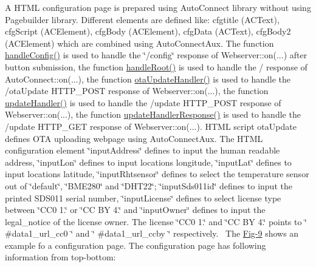 A H\+T\+ML configuration page is prepared using Auto\+Connect library without using Pagebuilder library. Different elements are defined like\+: cfgtitle (A\+C\+Text), cfg\+Script (A\+C\+Element), cfg\+Body (A\+C\+Element), cfg\+Data (A\+C\+Text), cfg\+Body2 (A\+C\+Element) which are combined using Auto\+Connect\+Aux. The function \mbox{\hyperlink{main_8h_a26b99cccf6c7e87054577b293e709733}{handle\+Config()}} is used to handle the \char`\"{}/config\char`\"{} response of Webserver\+::on(...) after button submission, the function \mbox{\hyperlink{main_8h_ad9a1e86fe8a8ccdeddbd435307dc8b9c}{handle\+Root()}} is used to handle the / response of Auto\+Connect\+::on(...), the function \mbox{\hyperlink{main_8h_adb1e5699d1d537b00a661d58f303b8c0}{ota\+Update\+Handler()}} is used to handle the /ota\+Update H\+T\+T\+P\+\_\+\+P\+O\+ST response of Webserver\+::on(...), the function \mbox{\hyperlink{main_8h_ac18409cbc727fcbb81831d42abceffc2}{update\+Handler()}} is used to handle the /update H\+T\+T\+P\+\_\+\+P\+O\+ST response of Webserver\+::on(...), the function \mbox{\hyperlink{main_8h_a27d0e99a6ba203be7c65cd32285853c2}{update\+Handler\+Response()}} is used to handle the /update H\+T\+T\+P\+\_\+\+G\+ET response of Webserver\+::on(...). H\+T\+ML script ota\+Update defines O\+TA uploading webpage using Auto\+Connect\+Aux. The H\+T\+ML configuration element \char`\"{}input\+Address\char`\"{} defines to input the human readable address, \char`\"{}input\+Lon\char`\"{} defines to input location\textquotesingle{}s longitude, \char`\"{}input\+Lat\char`\"{} defines to input location\textquotesingle{}s latitude, \char`\"{}input\+Rhtsensor\char`\"{} defines to select the temperature sensor out of \char`\"{}default\char`\"{}, \char`\"{}\+B\+M\+E280\char`\"{} and \char`\"{}\+D\+H\+T22\char`\"{}; \char`\"{}input\+Sds011id\char`\"{} defines to input the printed S\+D\+S011 serial number, \char`\"{}input\+License\char`\"{} defines to select license type between \char`\"{}\+C\+C0 1.\char`\"{} or \char`\"{}\+C\+C B\+Y 4.\char`\"{} and \char`\"{}input\+Owner\char`\"{} defines to input the legal\+\_\+notice of the license owner. The license \char`\"{}\+C\+C0 1.\char`\"{} and \char`\"{}\+C\+C B\+Y 4.\char`\"{} points to \char`\"{} \#data1\+\_\+url\+\_\+cc0 \char`\"{} and \char`\"{} \#data1\+\_\+url\+\_\+ccby \char`\"{} respectively.~\newline
 The \mbox{\hyperlink{index_Fig-9}{Fig-\/9}} shows an example fo a configuration page. The configuration page has following information from top-\/bottom\+:
